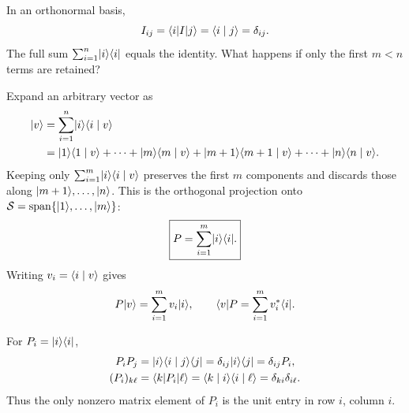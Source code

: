 In an orthonormal basis,
\[
 I_{ij}=\langle i\rvert I\lvert j\rangle=\langle i\mid j\rangle=\delta_{ij}.
\]
The full sum $\sum_{i=1}^{n}\lvert i\rangle\langle i\rvert$ equals the identity. What
happens if only the first $m<n$ terms are retained?

Expand an arbitrary vector as
\begin{align*}
 \lvert v\rangle&=\sum_{i=1}^{n}\lvert i\rangle\langle i\mid v\rangle\\
 &=\lvert 1\rangle\langle 1\mid v\rangle+\cdots+\lvert m\rangle\langle m\mid v\rangle
   +\lvert m+1\rangle\langle m+1\mid v\rangle+\cdots+\lvert n\rangle\langle n\mid v\rangle.
\end{align*}
Keeping only $\sum_{i=1}^{m}\lvert i\rangle\langle i\mid v\rangle$ preserves the first
$m$ components and discards those along $\lvert m+1\rangle,\ldots,\lvert n\rangle$.
This is the orthogonal projection onto
$\mathcal S=\operatorname{span}\{\lvert 1\rangle,\ldots,\lvert m\rangle\}$:
\[
 \boxed{P=\sum_{i=1}^{m}\lvert i\rangle\langle i\rvert.}
\]
Writing $v_i=\langle i\mid v\rangle$ gives
\[
 P\lvert v\rangle=\sum_{i=1}^{m}v_i\lvert i\rangle,
 \qquad
 \langle v\rvert P=\sum_{i=1}^{m}v_i^*\langle i\rvert.
\]

For $P_i=\lvert i\rangle\langle i\rvert$,
\begin{align*}
 P_iP_j
 &=\lvert i\rangle\langle i\mid j\rangle\langle j\rvert
 =\delta_{ij}\lvert i\rangle\langle j\rvert
 =\delta_{ij}P_i,\\
 (P_i)_{k\ell}
 &=\langle k\rvert P_i\lvert \ell\rangle
 =\langle k\mid i\rangle\langle i\mid \ell\rangle
 =\delta_{ki}\delta_{i\ell}.
\end{align*}
Thus the only nonzero matrix element of $P_i$ is the unit entry in
row $i$, column $i$.
